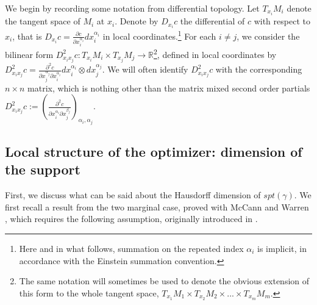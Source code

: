 \documentclass[letter,10pt]{article}
\theoremstyle{dotless}
\begin{document}
We begin by recording some notation from differential topology.  Let $T_{x_i}M_i$ denote the tangent space of $M_i$ at $x_i$.  Denote by $D_{x_i}c$  the differential of $c$ with respect to $x_i$, that is $D_{x_i}c=\frac{\partial c}{\partial x_i^{\alpha_i}}dx_i^{\alpha_i}$ in local coordinates.\footnote{Here and in what follows, summation on the repeated  index $\alpha_i$ is implicit, in accordance with the Einstein summation convention.}  For each $i \neq j$, we consider the bilinear form $D^2_{x_ix_j} c :T_{x_i}M_i \times T_{x_j}M_j \rightarrow \mathbb{R}$\footnote{The same notation will sometimes be used to denote the obvious extension of this form to the whole tangent space, $T_{x_1}M_1 \times T_{x_2}M_2 \times...\times T_{x_m}M_m$. }, defined in local coordinates by $D^2_{x_ix_j} c =\frac{\partial ^2 c}{ \partial x_j^{\alpha_j} \partial x^{\alpha_i}_i}dx_i^{\alpha_i} \otimes dx_j^{\alpha_j}$.   We will often identify  $D^2_{x_ix_j} c$ with the corresponding $n \times n$ matrix, which is nothing other than the matrix mixed second order partials $ D^2_{x_ix_j}c :=(\frac{\partial ^2 c}{\partial x^{\alpha_i}_i \partial x_j^{\beta_j}})_{\alpha_i, \alpha_j}$.

\begin{comment}\subsection{Existence of optimal measures and a dual problem}
We record here a classical result on the existence of minimizers to \eqref{mmk}.  As the theorem and proof are exactly analogous to well known results in the two marginal case, we only sketch the proof and refer to \cite{V} for details.

\newtheorem{Existence}{theorem}
\begin{Existence}
,
There exist a minimizer.  Furthermore, there exist measurable functions $u_1,u_2,...,u_m$ such that $\sum_{i=1}^mu_i(x_i) \leq  c(x_1,...,x_m)$, with equality $\gamma$ almost everywhere, for any solution $\gamma$.
\end{Existence}
\end{comment}
\subsection{Local structure of the optimizer: dimension of the support}\label{dimsection}
First, we discuss what can be said about the Hausdorff dimension of $spt(\gamma)$.  We first recall a result from the two marginal case, proved with McCann and Warren \cite{MPW}, which requires the following assumption, originally introduced in \cite{mtw}.
\end{document}
